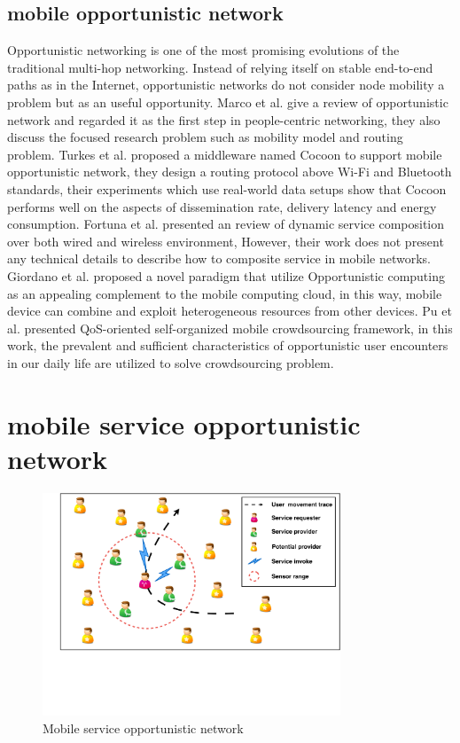 \documentclass[10pt,journal,compsoc]{IEEEtran}
\begin{document}
\subsection{mobile opportunistic network}
Opportunistic networking is one of the most promising evolutions of the traditional multi-hop networking. Instead of relying itself on stable end-to-end paths as in the Internet, opportunistic networks do not consider node mobility a problem but as an useful opportunity. 
Marco et al. \cite{Conti2014} give a review of opportunistic network and regarded it as the first step in people-centric networking, they also discuss the focused research problem such as mobility model and routing problem.
Turkes et al. \cite{turkes2016cocoon} proposed a middleware named Cocoon to support mobile opportunistic network, they design a routing protocol above Wi-Fi and Bluetooth standards, their experiments which use real-world data setups show that Cocoon performs well on the aspects of dissemination rate, delivery latency and energy consumption.
Fortuna et al. \cite{fortuna2009dynamic} presented an review of dynamic service composition over both wired and wireless environment, However, their work does not present any technical details to describe how to composite service in mobile networks.
Giordano et al. \cite{giordano2011human} proposed a novel paradigm that utilize Opportunistic computing as an appealing complement to the mobile computing cloud, in this way, mobile device can combine and exploit heterogeneous resources from other devices.
Pu et al. \cite{Pu2017crowd} presented QoS-oriented self-organized mobile crowdsourcing framework, in this work, the prevalent and sufficient characteristics of opportunistic user encounters in our daily life are utilized to solve crowdsourcing problem.


\section{mobile service opportunistic network}

\begin{figure}[!t]
\centering
\includegraphics[width=3.5in]{./img/pic2.pdf}
\caption{Mobile service opportunistic network}
\label{fig_mson}
\end{figure}
\end{document}
